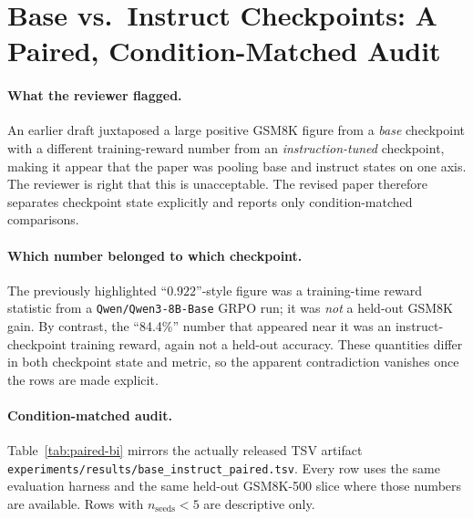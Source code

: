 
\section{Base vs.\ Instruct Checkpoints: A Paired, Condition-Matched Audit}
\label{sec:base-instruct-paired}

\paragraph{What the reviewer flagged.}
An earlier draft juxtaposed a large positive GSM8K figure from a
\emph{base} checkpoint with a different training-reward number from an
\emph{instruction-tuned} checkpoint, making it appear that the paper was
pooling base and instruct states on one axis. The reviewer is right that
this is unacceptable. The revised paper therefore separates checkpoint
state explicitly and reports only condition-matched comparisons.

\paragraph{Which number belonged to which checkpoint.}
The previously highlighted ``$0.922$''-style figure was a
training-time reward statistic from a \texttt{Qwen/Qwen3-8B-Base} GRPO run;
it was \emph{not} a held-out GSM8K gain. By contrast, the ``84.4\%''
number that appeared near it was an instruct-checkpoint training reward,
again not a held-out accuracy. These quantities differ in both checkpoint
state and metric, so the apparent contradiction vanishes once the rows are
made explicit.

\paragraph{Condition-matched audit.}
Table~\ref{tab:paired-bi} mirrors the actually released TSV artifact
\texttt{experiments/results/base\_instruct\_paired.tsv}. Every row uses the
same evaluation harness and the same held-out GSM8K-500 slice where those
numbers are available. Rows with $n_{\text{seeds}}<5$ are descriptive only.

